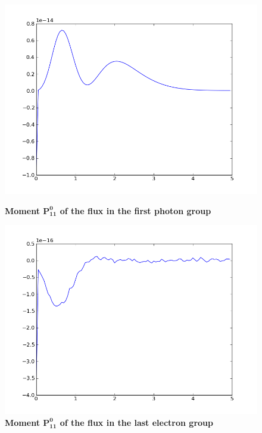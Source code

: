 \begin{figure}[H]
\begin{minipage}[b]{0.42\linewidth}
\centering
\includegraphics[width=\linewidth]{./images/al/group_0_moment_142}
\caption{\bf{Moment $\mathbf{P_{11}^0}$ of the flux in the first photon group}}
\label{test5}
\end{minipage}
\hspace{0.5cm}
\begin{minipage}[b]{0.42\linewidth}
\centering
\includegraphics[width=\linewidth]{./images/al/group_39_moment_142}
\caption{\bf{Moment $\mathbf{P_{11}^0}$ of the flux in the last electron group}}
\label{test6}
\end{minipage}
\end{figure}

